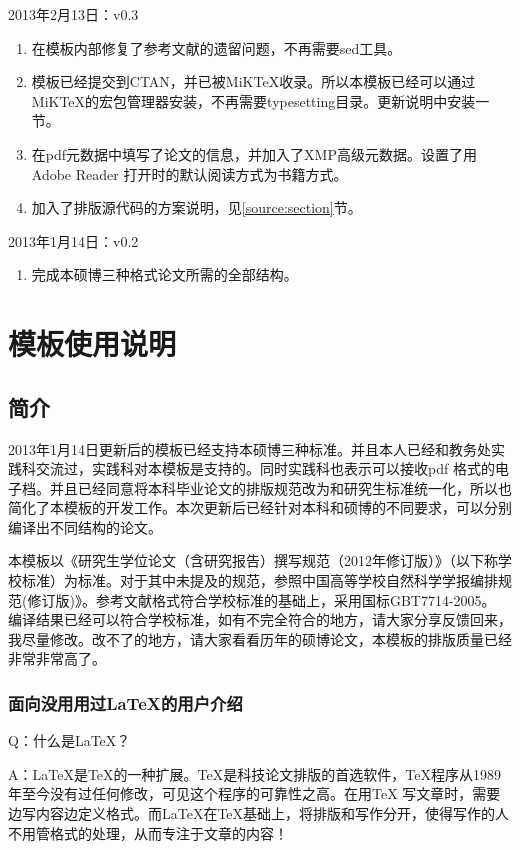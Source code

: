 \noindent
2013年2月13日：v0.3
\begin{enumerate}
\item 在模板内部修复了参考文献的遗留问题，不再需要sed工具。
\item 模板已经提交到CTAN，并已被MiKTeX收录。所以本模板已经可以通过MiKTeX的宏包管理器安装，不再需要typesetting目录。更新说明中安装一节。
\item 在pdf元数据中填写了论文的信息，并加入了XMP高级元数据。设置了用Adobe Reader 打开时的默认阅读方式为书籍方式。
\item 加入了排版源代码的方案说明，见\ref{source:section}节。
\end{enumerate}

\noindent
2013年1月14日：v0.2
\begin{enumerate}
\item 完成本硕博三种格式论文所需的全部结构。
\end{enumerate}

\chapter{模板使用说明}
\section{简介}
2013年1月14日更新后的模板已经支持本硕博三种标准。并且本人已经和教务处实践科交流过，实践科对本模板是支持的。同时实践科也表示可以接收pdf 格式的电子档。并且已经同意将本科毕业论文的排版规范改为和研究生标准统一化，所以也简化了本模板的开发工作。本次更新后已经针对本科和硕博的不同要求，可以分别编译出不同结构的论文。

本模板以《研究生学位论文（含研究报告）撰写规范（2012年修订版）》（以下称学校标准）为标准。对于其中未提及的规范，参照中国高等学校自然科学学报编排规范(修订版)》。参考文献格式符合学校标准的基础上，采用国标GBT7714-2005。 编译结果已经可以符合学校标准，如有不完全符合的地方，请大家分享反馈回来，我尽量修改。改不了的地方，请大家看看历年的硕博论文，本模板的排版质量已经非常非常高了。
\subsection{面向没用用过\LaTeX{}的用户介绍}
    Q：什么是\LaTeX{}？

A：\LaTeX{}是\TeX{}的一种扩展。\TeX{}是科技论文排版的首选软件，\TeX{}程序从1989 年至今没有过任何修改，可见这个程序的可靠性之高。在用\TeX{} 写文章时，需要边写内容边定义格式。而\LaTeX{}在\TeX{}基础上，将排版和写作分开，使得写作的人不用管格式的处理，从而专注于文章的内容！

